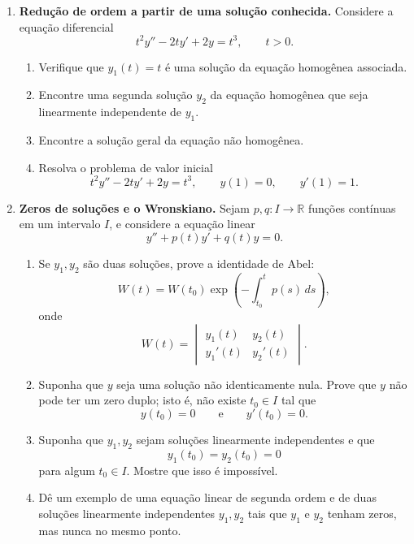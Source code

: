 \documentclass[a4paper,11pt,reqno]{amsart}
\begin{document}
\begin{enumerate}
\item \textbf{Redução de ordem a partir de uma solução conhecida.}
Considere a equação diferencial
\[
    t^2 y'' - 2t y' + 2y = t^3, \qquad t>0.
\]

\begin{enumerate}
    \item Verifique que $y_1(t)=t$ é uma solução da equação homogênea associada.

    \item Encontre uma segunda solução $y_2$ da equação homogênea que seja linearmente independente de $y_1$.

    \item Encontre a solução geral da equação não homogênea.

    \item Resolva o problema de valor inicial
    \[
        t^2 y'' - 2t y' + 2y = t^3, \qquad y(1)=0, \qquad y'(1)=1.
    \]
\end{enumerate}


\item \textbf{Zeros de soluções e o Wronskiano.}
Sejam $p,q:I\to\mathbb{R}$ funções contínuas em um intervalo $I$, e considere a equação linear
\[
    y'' + p(t)y' + q(t)y = 0.
\]

\begin{enumerate}
    \item Se $y_1,y_2$ são duas soluções, prove a identidade de Abel:
    \[
        W(t)=W(t_0)\exp\left(-\int_{t_0}^t p(s)\,ds\right),
    \]
    onde
    \[
        W(t)=
        \begin{vmatrix}
            y_1(t) & y_2(t)\\
            y_1'(t) & y_2'(t)
        \end{vmatrix}.
    \]

    \item Suponha que $y$ seja uma solução não identicamente nula. Prove que $y$ não pode ter um zero duplo; isto é, não existe $t_0\in I$ tal que
    \[
        y(t_0)=0
        \qquad\text{e}\qquad
        y'(t_0)=0.
    \]

    \item Suponha que $y_1,y_2$ sejam soluções linearmente independentes e que
    \[
        y_1(t_0)=y_2(t_0)=0
    \]
    para algum $t_0\in I$. Mostre que isso é impossível.

    \item Dê um exemplo de uma equação linear de segunda ordem e de duas soluções linearmente independentes $y_1,y_2$ tais que $y_1$ e $y_2$ tenham zeros, mas nunca no mesmo ponto.
\end{enumerate}



\end{enumerate}
\end{document}
